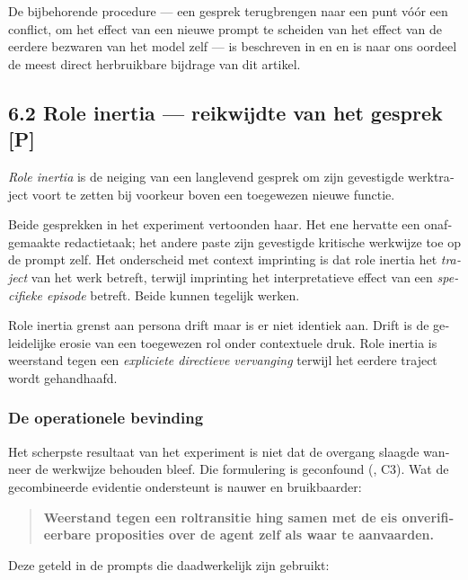 \begin{dutch}
De bijbehorende procedure — een gesprek terugbrengen naar een punt vóór een conflict, om het effect van een nieuwe prompt te scheiden van het effect van de eerdere bezwaren van het model zelf — is beschreven in  en  en is naar ons oordeel de meest direct herbruikbare bijdrage van dit artikel.


\subsection*{6.2 Role inertia — reikwijdte van het gesprek \textbf{[P]}}
\label{sec:nl:6.2}

\emph{Role inertia} is de neiging van een langlevend gesprek om zijn gevestigde werktraject voort te zetten bij voorkeur boven een toegewezen nieuwe functie.

Beide gesprekken in het experiment vertoonden haar. Het ene hervatte een onafgemaakte redactietaak; het andere paste zijn gevestigde kritische werkwijze toe op de prompt zelf. Het onderscheid met context imprinting is dat role inertia het \emph{traject} van het werk betreft, terwijl imprinting het interpretatieve effect van een \emph{specifieke episode} betreft. Beide kunnen tegelijk werken.

Role inertia grenst aan persona drift maar is er niet identiek aan. Drift is de geleidelijke erosie van een toegewezen rol onder contextuele druk. Role inertia is weerstand tegen een \emph{expliciete directieve vervanging} terwijl het eerdere traject wordt gehandhaafd.


\subsubsection*{De operationele bevinding}
\label{sec:nl:x-de-operationele-bevinding}

Het scherpste resultaat van het experiment is niet dat de overgang slaagde wanneer de werkwijze behouden bleef. Die formulering is geconfound (, C3). Wat de gecombineerde evidentie ondersteunt is nauwer en bruikbaarder:

\begin{quote}
\textbf{Weerstand tegen een roltransitie hing samen met de eis onverifieerbare proposities over de agent zelf als waar te aanvaarden.}
\end{quote}
Deze geteld in de prompts die daadwerkelijk zijn gebruikt:


\end{dutch}
